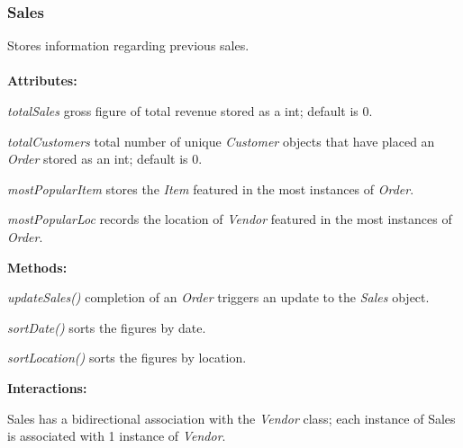 \subsubsection{Sales}
Stores information regarding previous sales.\\ \\
\textbf{Attributes:}
\begin{description}
\item\textit{totalSales} gross figure of total revenue stored as a int; default is 0.
\item\textit{totalCustomers} total number of unique \emph{Customer} objects that have placed an \emph{Order} stored as an int; default is 0.
\item\textit{mostPopularItem} stores the \emph{Item} featured in the most instances of \emph{Order}.
\item\textit{mostPopularLoc} records the location of \emph{Vendor} featured in the most instances of \emph{Order}.
\end{description}
\textbf{Methods:}
\begin{description}
\item\textit{updateSales()} completion of an \emph{Order} triggers an update to the \emph{Sales} object.
\item\textit{sortDate()} sorts the figures by date.
\item\textit{sortLocation()} sorts the figures by location.
\end{description}
\textbf{Interactions:}
\begin{description}
\item Sales has a bidirectional association with the \emph{Vendor} class; each instance of Sales is associated with 1 instance of \emph{Vendor}.
\end{description}

